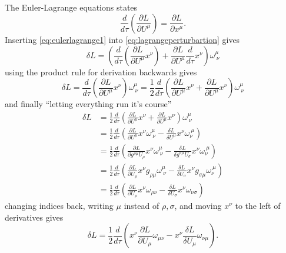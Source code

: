 \documentclass[11pt]{amsart}
\begin{document}
\subsection{}
The Euler-Lagrange equations states
\begin{equation}
\label{eq:eulerlagrange1}
\frac{d}{d\tau}\left(\frac{\partial L}{\partial U^\mu} \right) = \frac{\partial L}{\partial x^\mu}.
\end{equation}
Inserting \ref{eq:eulerlagrange1} into \ref{eq:lagrangeperturbartion} gives
\begin{equation}
\delta L = \left(\frac{d}{d\tau}\left(\frac{\partial L}{\partial U^\mu}x^\nu \right) + \frac{\partial L}{\partial U^\mu}\frac{d}{d\tau}x^\nu \right)\omega^\mu_{\ \nu}
\end{equation}
using the product rule for derivation backwards gives
\begin{equation}
\delta L = \frac{d}{d\tau}\left(\frac{\partial L}{\partial U^\mu}x^\nu \right)\omega^\mu_{\ \nu} 
= \frac{1}{2}\frac{d}{d\tau}\left(\frac{\partial L}{\partial U^\mu}x^\nu + \frac{\partial L}{\partial U^\mu}x^\nu \right)\omega^\mu_{\ \nu}
\end{equation}
and finally ``letting everything run it's course''
\begin{align*}
\delta L &= \frac{1}{2}\frac{d}{d\tau}\left(\frac{\partial L}{\partial U^\mu}x^\nu + \frac{\partial L}{\partial U^\mu}x^\nu \right)\omega^\mu_{\ \nu} \\
		&= \frac{1}{2}\frac{d}{d\tau}\left(\frac{\partial L}{\partial U^\mu}x^\nu \omega^\mu_{\ \nu} -\frac{\delta L}{\delta U^\mu}x^\nu\omega_\nu^{\ \mu} \right) \\
		&= \frac{1}{2}\frac{d}{d\tau}\left(\frac{\partial L}{\partial g^{\rho\mu}U_\rho}x^\nu \omega^\mu_{\ \nu} -\frac{\delta L}{\delta g^{\sigma\mu}U_\sigma}x^\nu\omega_\nu^{\ \mu} \right) \\
		&= \frac{1}{2}\frac{d}{d\tau}\left(\frac{\partial L}{\partial U_\rho}x^\nu g_{\rho\mu} \omega^\mu_{\ \nu} -\frac{\delta L}{\delta U_\sigma}x^\nu g_{\sigma\mu}\omega_\nu^{\ \mu} \right) \\
		&= \frac{1}{2}\frac{d}{d\tau}\left(\frac{\partial L}{\partial U_\rho}x^\nu  \omega_{\rho\nu} -\frac{\delta L}{\delta U_\sigma}x^\nu \omega_{\nu\sigma} \right)		
\end{align*} 
changing indices back, writing $\mu$ instead of $\rho,\sigma$, and moving $x^\nu$ to the left of derivatives gives
\begin{equation*}
\delta L = \frac{1}{2}\frac{d}{d\tau}\left(x^\nu\frac{\partial L}{\partial U_\mu}  \omega_{\mu\nu} - x^\nu\frac{\delta L}{\delta U_\mu} \omega_{\nu\mu} \right).		
\end{equation*}
\end{document}
